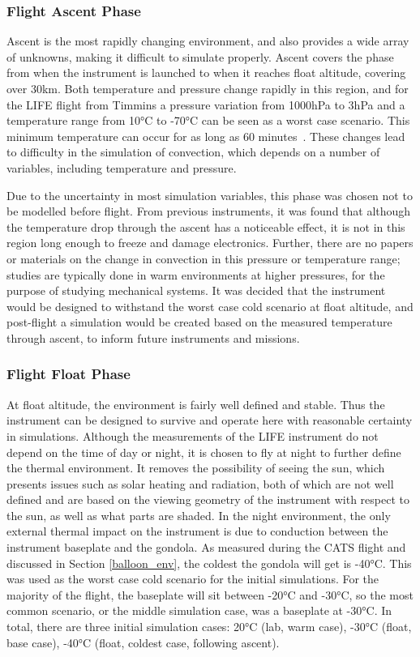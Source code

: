 \subsubsection{Flight Ascent Phase}
Ascent is the most rapidly changing environment, and also provides a wide array of unknowns, making it difficult to simulate properly. Ascent covers the phase from when the instrument is launched to when it reaches float altitude, covering over 30km. Both temperature and pressure change rapidly in this region, and for the LIFE flight from Timmins a pressure variation from 1000hPa to 3hPa and a temperature range from 10°C to -70°C can be seen as a worst case scenario. This minimum temperature can occur for as long as 60 minutes~\citep{STRATOS_CARMENCITA_doc}. These changes lead to difficulty in the simulation of convection, which depends on a number of variables, including temperature and pressure.

Due to the uncertainty in most simulation variables, this phase was chosen not to be modelled before flight. From previous instruments, it was found that although the temperature drop through the ascent has a noticeable effect, it is not in this region long enough to freeze and damage electronics. Further, there are no papers or materials on the change in convection in this pressure or temperature range; studies are typically done in warm environments at higher pressures, for the purpose of studying mechanical systems. It was decided that the instrument would be designed to withstand the worst case cold scenario at float altitude, and post-flight a simulation would be created based on the measured temperature through ascent, to inform future instruments and missions.

\subsubsection{Flight Float Phase}
At float altitude, the environment is fairly well defined and stable. Thus the instrument can be designed to survive and operate here with reasonable certainty in simulations. Although the measurements of the LIFE instrument do not depend on the time of day or night, it is chosen to fly at night to further define the thermal environment. It removes the possibility of seeing the sun, which presents issues such as solar heating and radiation, both of which are not well defined and are based on the viewing geometry of the instrument with respect to the sun, as well as what parts are shaded. In the night environment, the only external thermal impact on the instrument is due to conduction between the instrument baseplate and the gondola. As measured during the CATS flight and discussed in Section \ref{balloon_env}, the coldest the gondola will get is -40°C. This was used as the worst case cold scenario for the initial simulations. For the majority of the flight, the baseplate will sit between -20°C and -30°C, so the most common scenario, or the middle simulation case, was a baseplate at -30°C. In total, there are three initial simulation cases: 20°C (lab, warm case), -30°C (float, base case), -40°C (float, coldest case, following ascent). 

